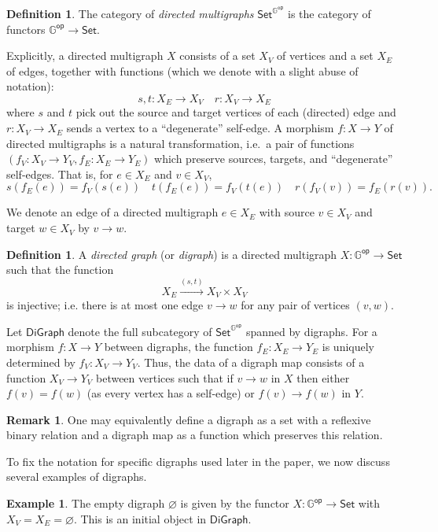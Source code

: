 \documentclass[11pt]{article}
\theoremstyle{definition}
\newtheorem{defi}[theo]{Definition}
\newtheorem{remark}[theo]{Remark}
\newtheorem{example}[theo]{Example}
\numberwithin{equation}{section}
\newcommand{\Set}{\mathsf{Set}}
\newcommand{\DiGraph}{\mathsf{DiGraph}}
\newcommand{\op}{\mathsf{op}}
\newcommand{\from}{\colon}
\begin{document}
\begin{defi}
    The category of \emph{directed multigraphs} $\Set^{\mathbb{G}^\op}$ is the category of functors $\mathbb{G}^\op \to \Set$.
\end{defi}
Explicitly, a directed multigraph $X$ consists of a set $X_V$ of vertices and a set $X_E$ of edges, together with functions (which we denote with a slight abuse of notation):
\[ s,t\colon X_E\to X_V \quad r \from X_V \to X_E \] 
where $s$ and $t$ pick out the source and target vertices of each (directed) edge and $r\colon X_V\to X_E$ sends a vertex to a ``degenerate'' self-edge.
A morphism $f \from X \to Y$ of directed multigraphs is a natural transformation, i.e.~a pair of functions $(f_V \from X_V \to Y_V, f_E \from X_E \to Y_E)$ which preserve sources, targets, and ``degenerate'' self-edges.
That is, for $e \in X_E$ and $v \in X_V$,
\[ s(f_E(e)) = f_V(s(e)) \quad t(f_E(e)) = f_V(t(e)) \quad r(f_V(v)) = f_E(r(v)).  \]

We denote an edge of a directed multigraph $e\in X_E$ with source $v \in X_V$ and target $w \in X_V$ by $v \to w$.
\begin{defi}
    A \emph{directed graph} (or \emph{digraph}) is a directed multigraph $X\colon\mathbb{G}^\op\to\Set$ such that the function $$X_E\xrightarrow{(s,t)} X_V\times X_V$$ is injective; i.e. there is at most one edge $v\to w$ for any pair of vertices $(v,w)$.
\end{defi}
Let $\DiGraph$ denote the full subcategory of $\Set^{\mathbb{G}^\op}$ spanned by digraphs.
For a morphism $f \from X \to Y$ between digraphs, the function $f_E \from X_E \to Y_E$ is uniquely determined by $f_V \from X_V \to Y_V$.
Thus, the data of a digraph map consists of a function $X_V \to Y_V$ between vertices such that if $v \to w$ in $X$ then either $f(v) = f(w)$ (as every vertex has a self-edge) or $f(v) \to f(w)$ in $Y$.

\begin{remark}
    One may equivalently define a digraph as a set with a reflexive binary relation and a digraph map as a function which preserves this relation.
\end{remark}



To fix the notation for specific digraphs used later in the paper, we now discuss several examples of digraphs.

\begin{example}
    The empty digraph $\varnothing$ is given by the functor $X\colon\mathbb{G}^\op\to\Set$ with $X_V=X_E=\varnothing$. This is an initial object in $\DiGraph$.  
\end{example}
\end{document}
